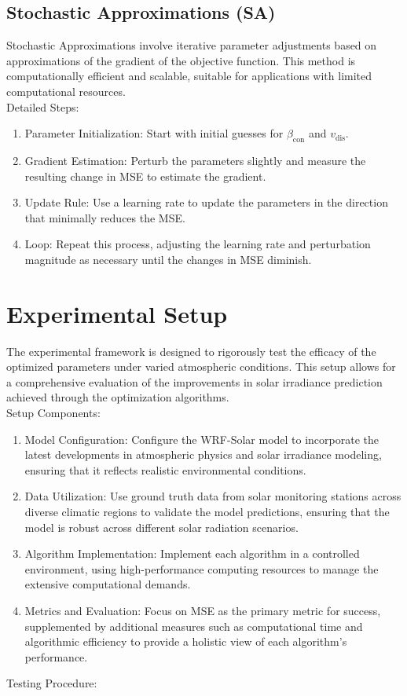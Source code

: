 \documentclass[conference]{IEEEtran}
\begin{document}
\subsection{Stochastic Approximations (SA)}
Stochastic Approximations involve iterative parameter adjustments based on approximations of the gradient of the objective function. This method is computationally efficient and scalable, suitable for applications with limited computational resources.
\\
Detailed Steps:
\begin{enumerate}
    \item Parameter Initialization: Start with initial guesses for \(\beta_{\text{con}}\) and \(v_{\text{dis}}\).
    \item Gradient Estimation: Perturb the parameters slightly and measure the resulting change in MSE to estimate the gradient.
    \item Update Rule: Use a learning rate to update the parameters in the direction that minimally reduces the MSE.
    \item Loop: Repeat this process, adjusting the learning rate and perturbation magnitude as necessary until the changes in MSE diminish.
\end{enumerate}


\section{Experimental Setup}
The experimental framework is designed to rigorously test the efficacy of the optimized parameters under varied atmospheric conditions. This setup allows for a comprehensive evaluation of the improvements in solar irradiance prediction achieved through the optimization algorithms.
\\
Setup Components:
\begin{enumerate}
    \item Model Configuration: Configure the WRF-Solar model to incorporate the latest developments in atmospheric physics and solar irradiance modeling, ensuring that it reflects realistic environmental conditions.

    \item Data Utilization: Use ground truth data from solar monitoring stations across diverse climatic regions to validate the model predictions, ensuring that the model is robust across different solar radiation scenarios.

    \item Algorithm Implementation: Implement each algorithm in a controlled environment, using high-performance computing resources to manage the extensive computational demands.

    \item Metrics and Evaluation: Focus on MSE as the primary metric for success, supplemented by additional measures such as computational time and algorithmic efficiency to provide a holistic view of each algorithm’s performance.

\end{enumerate}
Testing Procedure:
\end{document}
